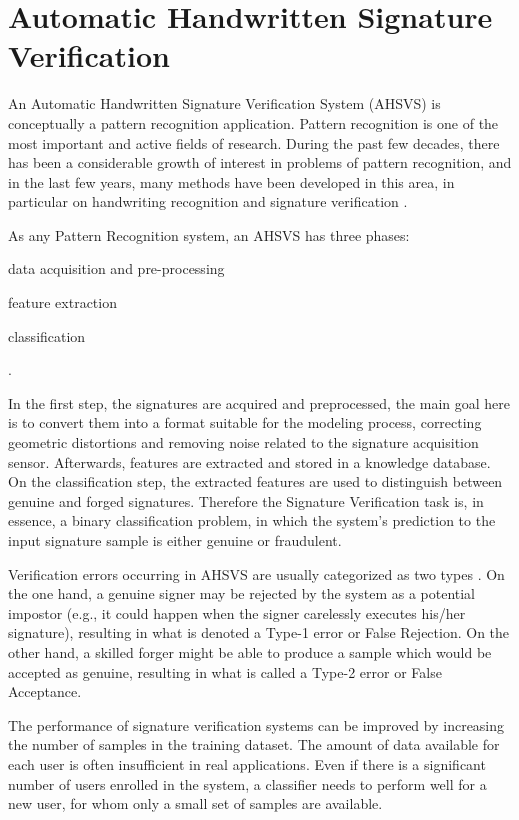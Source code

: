 \section{Automatic Handwritten Signature Verification}
An Automatic Handwritten Signature Verification System (AHSVS) is conceptually a pattern recognition application. Pattern recognition is one of the most important and active fields of research. During the past few decades, there has been a considerable growth of interest in problems of pattern recognition, and in the last few years, many methods have been developed in this area, in particular on handwriting recognition and signature verification \cite{book}. 

As any Pattern Recognition system, an AHSVS has three phases:
\begin{inlinelist}
\item data acquisition and pre-processing
\item feature extraction
\item classification
\end{inlinelist} \cite{impedovo2008state}.

In the first step, the signatures are acquired and preprocessed, the main goal here is to convert them into a format suitable for the modeling process, correcting geometric distortions and removing noise related to the signature acquisition sensor. Afterwards, features are extracted and stored in a knowledge database.  On the classification step, the extracted features are used to distinguish between genuine and forged signatures. Therefore the Signature Verification task is, in essence, a binary classification problem, in which the system's prediction to the input signature sample is either genuine or fraudulent.

Verification errors occurring in AHSVS are usually categorized as two types \cite{fairhurst1997signature}. On the one hand, a genuine signer may be rejected by the system as a potential impostor (e.g., it could happen when the signer carelessly executes his/her signature), resulting in what is denoted a Type-1 error or False
Rejection. On the other hand, a skilled forger might be able to produce a sample which would be accepted as genuine, resulting in what is called a Type-2 error or False Acceptance. 

The performance of signature verification systems can be improved by increasing the number of samples in the training dataset. The amount of data available for each user is often insufficient in real applications. Even if there is a significant number of users enrolled in the system, a classifier needs to perform well for a new user, for whom only a small set of samples are available.

